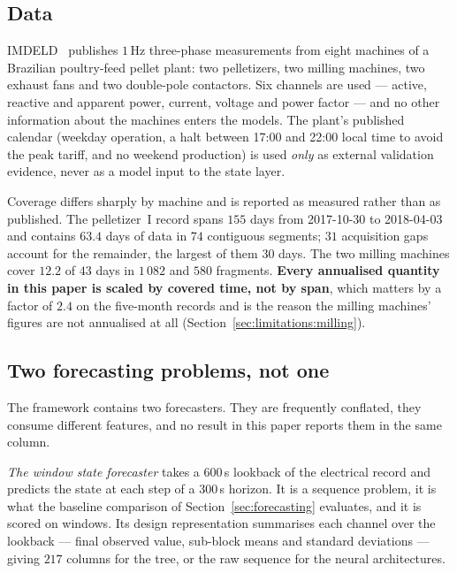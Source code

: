 \subsection{Data}
\label{sec:method:data}

IMDELD~\cite{imdeld2018dataset,martins2018imdeld} publishes $1$\,Hz
three-phase measurements from eight machines of a Brazilian
poultry-feed pellet plant: two pelletizers, two milling machines, two
exhaust fans and two double-pole contactors. Six channels are used ---
active, reactive and apparent power, current, voltage and power factor
--- and no other information about the machines enters the models. The
plant's published calendar (weekday operation, a halt between 17:00 and
22:00 local time to avoid the peak tariff, and no weekend production)
is used \emph{only} as external validation evidence, never as a model
input to the state layer.

Coverage differs sharply by machine and is reported as measured rather
than as published. The pelletizer~I record spans $155$ days from
2017-10-30 to 2018-04-03 and contains $63.4$ days of data in $74$
contiguous segments; $31$ acquisition gaps account for the remainder,
the largest of them $30$ days. The two milling machines cover $12.2$ of
$43$ days in $1\,082$ and $580$ fragments. \textbf{Every annualised
quantity in this paper is scaled by covered time, not by span}, which
matters by a factor of $2.4$ on the five-month records and is the
reason the milling machines' figures are not annualised at all
(Section~\ref{sec:limitations:milling}).



\subsection{Two forecasting problems, not one}
\label{sec:method:forecasting}

The framework contains two forecasters. They are frequently conflated,
they consume different features, and no result in this paper reports
them in the same column.

\emph{The window state forecaster} takes a $600$\,s lookback of the
electrical record and predicts the state at each step of a $300$\,s
horizon. It is a sequence problem, it is what the baseline comparison of
Section~\ref{sec:forecasting} evaluates, and it is scored on windows.
Its design representation summarises each channel over the lookback ---
final observed value, sub-block means and standard deviations --- giving
$217$ columns for the tree, or the raw sequence for the neural
architectures.

